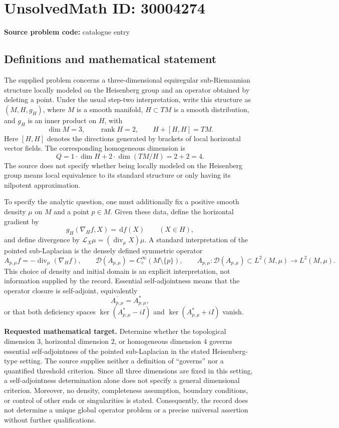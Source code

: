 \documentclass[11pt]{article}
\newcommand{\dd}{\,\mathrm{d}}
\begin{document}
\section*{UnsolvedMath ID: 30004274}
\textbf{Source problem code:} catalogue entry
\subsection{Definitions and mathematical statement}
The supplied problem concerns a three-dimensional equiregular sub-Riemannian structure locally modeled on the Heisenberg group and an operator obtained by deleting a point. Under the usual step-two interpretation, write this structure as \((M,H,g_H)\), where \(M\) is a smooth manifold, \(H\subset TM\) is a smooth distribution, and \(g_H\) is an inner product on \(H\), with
\[
\dim M=3,\qquad \operatorname{rank}H=2,\qquad H+[H,H]=TM.
\]
Here \([H,H]\) denotes the directions generated by brackets of local horizontal vector fields. The corresponding homogeneous dimension is
\[
Q=1\cdot\dim H+2\cdot\dim(TM/H)=2+2=4.
\]
The source does not specify whether being locally modeled on the Heisenberg group means local equivalence to its standard structure or only having its nilpotent approximation.

To specify the analytic question, one must additionally fix a positive smooth density \(\mu\) on \(M\) and a point \(p\in M\). Given these data, define the horizontal gradient by
\[
g_H(\nabla_H f,X)=\dd f(X)\qquad(X\in H),
\]
and define divergence by \(\mathcal L_X\mu=(\operatorname{div}_{\mu}X)\mu\). A standard interpretation of the pointed sub-Laplacian is the densely defined symmetric operator
\[
A_{p,\mu}f=-\operatorname{div}_{\mu}(\nabla_H f),\qquad
\mathcal D(A_{p,\mu})=C_c^\infty(M\setminus\{p\}),\qquad
A_{p,\mu}:\mathcal D(A_{p,\mu})\subset L^2(M,\mu)\longrightarrow L^2(M,\mu).
\]
This choice of density and initial domain is an explicit interpretation, not information supplied by the record. Essential self-adjointness means that the operator closure is self-adjoint, equivalently
\[
\overline{A_{p,\mu}}=A_{p,\mu}^{*},
\]
or that both deficiency spaces \(\ker(A_{p,\mu}^{*}-iI)\) and \(\ker(A_{p,\mu}^{*}+iI)\) vanish.

\textbf{Requested mathematical target.} Determine whether the topological dimension \(3\), horizontal dimension \(2\), or homogeneous dimension \(4\) governs essential self-adjointness of the pointed sub-Laplacian in the stated Heisenberg-type setting. The source supplies neither a definition of ``governs'' nor a quantified threshold criterion. Since all three dimensions are fixed in this setting, a self-adjointness determination alone does not specify a general dimensional criterion. Moreover, no density, completeness assumption, boundary conditions, or control of other ends or singularities is stated. Consequently, the record does not determine a unique global operator problem or a precise universal assertion without further qualifications.
\end{document}
